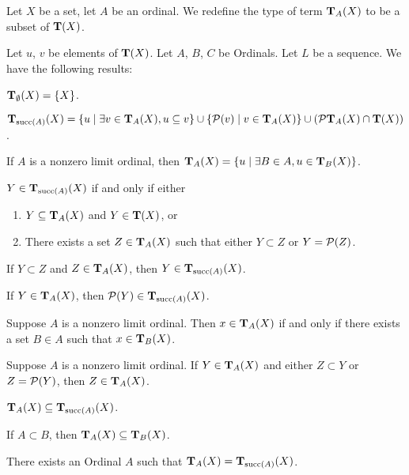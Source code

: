 \documentclass{article}
\begin{document}
\begin{definition}
Let $X$ be a set, let $A$ be an ordinal.
We redefine the type of term $\TarskiClass[A]{X}$ to be a subset of $\TarskiClass{X}$.
\end{definition}

Let $u$, $v$ be elements of $\TarskiClass{X}$. Let $A$, $B$, $C$ be
Ordinals. Let $L$ be a sequence.
We have the following results:
\begin{thm}
\item\label{classes1:7} $\TarskiClass[\emptyset]{X}=\{X\}$.
\item\label{classes1:8} $\TarskiClass[\succ(A)]{X}=\{u\mid\exists v\in\TarskiClass[A]{X}, u\subset v\}\cup\{\powerset(v)\mid v\in\TarskiClass[A]{X}\}\cup(\powerset\TarskiClass[A]{X}\cap\TarskiClass{X})$.
\item\label{classes1:9} If $A$ is a nonzero limit ordinal,
  then $\TarskiClass[A]{X}=\{u\mid\exists B\in A,u\in\TarskiClass[B]{X}\}$.
\item\label{classes1:10} $Y\in\TarskiClass[\succ(A)]{X}$ if and only if
  either
  \begin{enumerate}[label=(\roman*)]
  \item $Y\subset\TarskiClass[A]{X}$ and $Y\in\TarskiClass{X}$, or
  \item There exists a set $Z\in\TarskiClass[A]{X}$ such that either
    $Y\subset Z$ or $Y=\mathcal{P}(Z)$.
  \end{enumerate}
\item\label{classes1:11} If $Y\subset Z$ and $Z\in\TarskiClass[A]{X}$,
  then $Y\in\TarskiClass[\succ(A)]{X}$.
\item\label{classes1:12} If $Y\in\TarskiClass[A]{X}$,
  then $\powerset(Y)\in\TarskiClass[\succ(A)]{X}$.
\item\label{classes1:13} Suppose $A$ is a nonzero limit ordinal.
  Then $x\in\TarskiClass[A]{X}$ if and only if there exists a set $B\in A$ such that
  $x\in\TarskiClass[B]{X}$.
\item\label{classes1:14} Suppose $A$ is a nonzero limit ordinal.
  If $Y\in\TarskiClass[A]{X}$ and either $Z\subset Y$ or
  $Z=\mathcal{P}(Y)$,
  then $Z\in\TarskiClass[A]{X}$.
\item\label{classes1:15} $\TarskiClass[A]{X}\subset\TarskiClass[\succ(A)]{X}$.
\item\label{classes1:16} If $A\subset B$,
  then $\TarskiClass[A]{X}\subset\TarskiClass[B]{X}$.
\item\label{classes1:17} There exists an Ordinal $A$ such that $\TarskiClass[A]{X}=\TarskiClass[\succ(A)]{X}$.

\end{thm}
\end{document}

